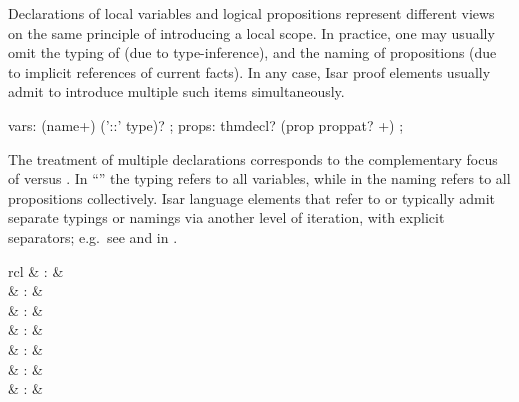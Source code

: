 \begin{isabellebody}
\begin{isamarkuptext}
  \medskip Declarations of local variables  and
  logical propositions  represent different views on
  the same principle of introducing a local scope.  In practice, one
  may usually omit the typing of  (due to
  type-inference), and the naming of propositions (due to implicit
  references of current facts).  In any case, Isar proof elements
  usually admit to introduce multiple such items simultaneously.

  \begin{rail}
    vars: (name+) ('::' type)?
    ;
    props: thmdecl? (prop proppat? +)
    ;
  \end{rail}

  The treatment of multiple declarations corresponds to the
  complementary focus of  versus
  .  In ``''
  the typing refers to all variables, while in  the naming refers to all propositions collectively.
  Isar language elements that refer to  or
   typically admit separate typings or namings via
  another level of iteration, with explicit 
  separators; e.g.\ see  and  in
  .%
\end{isamarkuptext}%
\isamarkuptrue%
%
\isamarkuptrue%
%
\begin{isamarkuptext}%
\begin{matharray}{rcl}
     & : & \isarantiq \\
     & : & \isarantiq \\
     & : & \isarantiq \\
     & : & \isarantiq \\
     & : & \isarantiq \\
     & : & \isarantiq \\
     & : & \isarantiq \\

\end{matharray}
\end{isamarkuptext}
\end{isabellebody}
